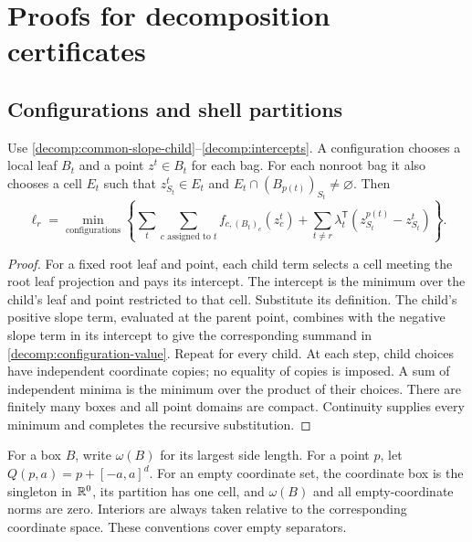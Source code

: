 \section{Proofs for decomposition certificates}
\label{app:decomp}

\subsection{Configurations and shell partitions}
\label{app:decomp:existence}

\begin{lemma}\label{decomp:unfolding}
Use \eqref{decomp:common-slope-child}--\eqref{decomp:intercepts}.
A configuration chooses a local leaf $B_t$ and a point $z^t\in B_t$ for
each bag. For each nonroot bag it also chooses a cell $E_t$ such that
$z^t_{S_t}\in E_t$ and $E_t\cap(B_{p(t)})_{S_t}\ne\varnothing$.
Then
\begin{equation}\label{decomp:configuration-value}
 \ell_r=\min_{\text{configurations}}
 \left\{\sum_t\sum_{c\text{ assigned to }t}f_{c,(B_t)_c}(z^t_c)
 +\sum_{t\ne r}\lambda_t^{\mathsf T}
                    (z^{p(t)}_{S_t}-z^t_{S_t})\right\}.
\end{equation}
\end{lemma}
\begin{proof}
For a fixed root leaf and point, each child term selects a cell meeting
the root leaf projection and pays its intercept. The intercept is the
minimum over the child's leaf and point restricted to that cell.
Substitute its definition. The child's positive slope term, evaluated at
the parent point, combines with the negative slope term in its intercept
to give the corresponding summand in
\eqref{decomp:configuration-value}. Repeat for every child.
At each step, child choices have independent coordinate copies; no
equality of copies is imposed. A sum of independent minima is the minimum
over the product of their choices. There are finitely many boxes and all
point domains are compact. Continuity supplies every minimum and completes
the recursive substitution.
\end{proof}

For a box $B$, write $\omega(B)$ for its largest side length. For a point
$p$, let $Q(p,a)=p+[-a,a]^d$.
For an empty coordinate set, the coordinate box is the singleton in
$\mathbb{R}^0$, its partition has one cell, and $\omega(B)$ and all
empty-coordinate norms are zero. Interiors are always taken relative
to the corresponding coordinate space. These conventions cover empty
separators.

